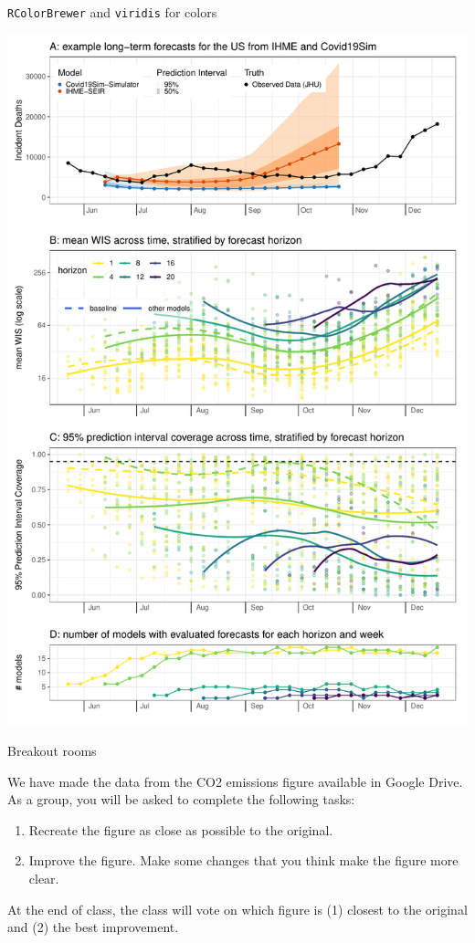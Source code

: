 \documentclass[table]{beamer}\usepackage[]{graphicx}\usepackage[]{color}
\begin{document}
\begin{frame}[fragile]{{\tt RColorBrewer} and {\tt viridis} for colors}

\includegraphics[width=.5\textwidth]{figure-static/fig-by-horizon-week}

\end{frame}



\begin{frame}[fragile]{Breakout rooms}

We have made the data from the CO2 emissions figure available in Google Drive. As a group, you will be asked to complete the following tasks:

\begin{enumerate}
    \item Recreate the figure as close as possible to the original.
    \item Improve the figure. Make some changes that you think make the figure more clear.
\end{enumerate}

At the end of class, the class will vote on which figure is (1) closest to the original and (2) the best improvement.


\end{frame}
\end{document}
